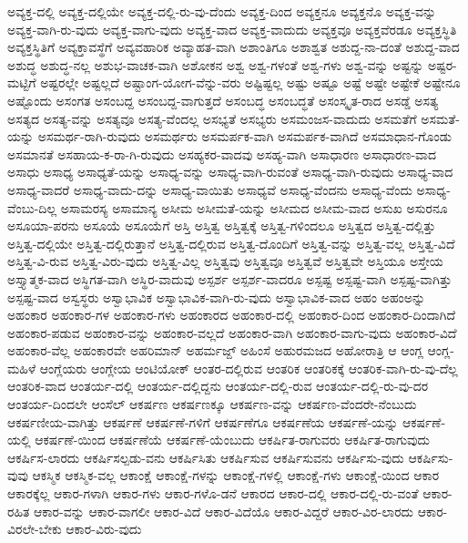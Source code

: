 {ಅವ್ಯಕ್ತ-ದಲ್ಲಿ
ಅವ್ಯಕ್ತ-ದಲ್ಲಿಯೇ
ಅವ್ಯಕ್ತ-ದಲ್ಲಿ-ರು-ವು-ದೆಂದು
ಅವ್ಯಕ್ತ-ದಿಂದ
ಅವ್ಯಕ್ತನೂ
ಅವ್ಯಕ್ತನೊ
ಅವ್ಯಕ್ತ-ವನ್ನು
ಅವ್ಯಕ್ತ-ವಾಗಿ-ರು-ವುದು
ಅವ್ಯಕ್ತ-ವಾಗು-ವುದು
ಅವ್ಯಕ್ತ-ವಾದ
ಅವ್ಯಕ್ತ-ವಾದುದು
ಅವ್ಯಕ್ತವೂ
ಅವ್ಯಕ್ತವೆರಡೂ
ಅವ್ಯಕ್ತಸ್ಥಿತಿ
ಅವ್ಯಕ್ತಸ್ಥಿತಿಗೆ
ಅವ್ಯಕ್ತಾವಸ್ಥೆಗೆ
ಅವ್ಯವಹಾರಿಕ
ಅವ್ಯಾಹತ-ವಾಗಿ
ಅಶಾಂತಿಗೂ
ಅಶಾಶ್ವತ
ಅಶುದ್ದ-ನಾ-ದಂತೆ
ಅಶುದ್ದ-ವಾದ
ಅಶುದ್ಧ
ಅಶುದ್ಧ-ನಲ್ಲ
ಅಶುಭ-ವಾಚಕ-ವಾಗಿ
ಅಶೋಕನ
ಅಶ್ವ
ಅಶ್ವ-ಗಳಂತೆ
ಅಶ್ವ-ಗಳು
ಅಶ್ವ-ವನ್ನು
ಅಷ್ಟನ್ನು
ಅಷ್ಟರ-ಮಟ್ಟಿಗೆ
ಅಷ್ಟರಲ್ಲೇ
ಅಷ್ಟಲ್ಲದೆ
ಅಷ್ಟಾಂಗ-ಯೋಗ-ವೆನ್ನು-ವರು
ಅಷ್ಟಿಷ್ಟಲ್ಲ
ಅಷ್ಟು
ಅಷ್ಟೂ
ಅಷ್ಟೆ
ಅಷ್ಟೇ
ಅಷ್ಟೇಕೆ
ಅಷ್ಟೇನೂ
ಅಷ್ಟೊಂದು
ಅಸಂಗತ
ಅಸಂಬದ್ದ
ಅಸಂಬದ್ದ-ವಾಗುತ್ತದೆ
ಅಸಂಬದ್ಧ
ಅಸಂಬದ್ಧತೆ
ಅಸಂಸ್ಕೃತ-ರಾದ
ಅಸಡ್ಡೆ
ಅಸತ್ಯ
ಅಸತ್ಯದ
ಅಸತ್ಯ-ವನ್ನು
ಅಸತ್ಯವೂ
ಅಸತ್ಯ-ವೆಂದಲ್ಲ
ಅಸಭ್ಯತೆ
ಅಸಭ್ಯರು
ಅಸಮಂಜಸ-ವಾದುದು
ಅಸಮತೆಗೆ
ಅಸಮತೆ-ಯನ್ನು
ಅಸಮರ್ಥ-ರಾಗಿ-ರುವುದು
ಅಸಮರ್ಥರು
ಅಸಮರ್ಪಕ-ವಾಗಿ
ಅಸಮರ್ಪಕ-ವಾಗಿದೆ
ಅಸಮಾಧಾನ-ಗೊಂಡು
ಅಸಮಾನತೆ
ಅಸಹಾಯ-ಕ-ರಾ-ಗಿ-ರುವುದು
ಅಸಹ್ಯಕರ-ವಾದವು
ಅಸಹ್ಯ-ವಾಗಿ
ಅಸಾಧಾರಣ
ಅಸಾಧಾರಣ-ವಾದ
ಅಸಾಧು
ಅಸಾಧ್ಯ
ಅಸಾಧ್ಯತೆ-ಯನ್ನು
ಅಸಾಧ್ಯ-ವನ್ನು
ಅಸಾಧ್ಯ-ವಾಗಿ-ರುವಂತೆ
ಅಸಾಧ್ಯ-ವಾಗಿ-ರುವುದು
ಅಸಾಧ್ಯ-ವಾದ
ಅಸಾಧ್ಯ-ವಾದರೆ
ಅಸಾಧ್ಯ-ವಾದು-ದನ್ನು
ಅಸಾಧ್ಯ-ವಾಯಿತು
ಅಸಾಧ್ಯವೆ
ಅಸಾಧ್ಯ-ವೆಂದನು
ಅಸಾಧ್ಯ-ವೆಂದು
ಅಸಾಧ್ಯ-ವೆಂಬು-ದಿಲ್ಲ
ಅಸಾಮರಸ್ಯ
ಅಸಾಮಾನ್ಯ
ಅಸೀಮ
ಅಸೀಮತೆ-ಯನ್ನು
ಅಸೀಮದ
ಅಸೀಮ-ವಾದ
ಅಸುಖ
ಅಸುರನೂ
ಅಸೂಯಾ-ಪರನು
ಅಸೂಯೆ
ಅಸೂಯೆಗೆ
ಅಸ್ತಿ
ಅಸ್ತಿತ್ವ
ಅಸ್ತಿತ್ವಕ್ಕೆ
ಅಸ್ತಿತ್ವ-ಗಳಿಂದಲೂ
ಅಸ್ತಿತ್ವದ
ಅಸ್ತಿತ್ವ-ದಲ್ಲಿತ್ತು
ಅಸ್ತಿತ್ವ-ದಲ್ಲಿಯೇ
ಅಸ್ತಿತ್ವ-ದಲ್ಲಿರುತ್ತಾನೆ
ಅಸ್ತಿತ್ವ-ದಲ್ಲಿರುವ
ಅಸ್ತಿತ್ವ-ದೊಂದಿಗೆ
ಅಸ್ತಿತ್ವ-ವನ್ನು
ಅಸ್ತಿತ್ವ-ವಲ್ಲ
ಅಸ್ತಿತ್ವ-ವಿದೆ
ಅಸ್ತಿತ್ವ-ವಿ-ರುವ
ಅಸ್ತಿತ್ವ-ವಿರು-ವುದು
ಅಸ್ತಿತ್ವ-ವಿಲ್ಲ
ಅಸ್ತಿತ್ವವು
ಅಸ್ತಿತ್ವವೂ
ಅಸ್ತಿತ್ವವೆ
ಅಸ್ತಿತ್ವವೇ
ಅಸ್ತಿಯೂ
ಅಸ್ತೇಯ
ಅಸ್ತ್ಯಾತ್ಮಕ-ವಾದ
ಅಸ್ಥಿಗತ-ವಾಗಿ
ಅಸ್ಥಿರ-ವಾದುವು
ಅಸ್ಪರ್ಶ
ಅಸ್ಪರ್ಶ-ವಾದರೂ
ಅಸ್ಪಷ್ಟ
ಅಸ್ಪಷ್ಟ-ವಾಗಿ
ಅಸ್ಪಷ್ಟ-ವಾಗಿತ್ತು
ಅಸ್ಪಷ್ಟ-ವಾದ
ಅಸ್ವಸ್ಥರು
ಅಸ್ವಾಭಾವಿಕ
ಅಸ್ವಾಭಾವಿಕ-ವಾಗಿ-ರು-ವುದು
ಅಸ್ವಾಭಾವಿಕ-ವಾದ
ಅಹಂ
ಅಹಂಅನ್ನು
ಅಹಂಕಾರ
ಅಹಂಕಾರ-ಗಳ
ಅಹಂಕಾರ-ಗಳು
ಅಹಂಕಾರದ
ಅಹಂಕಾರ-ದಲ್ಲಿ
ಅಹಂಕಾರ-ದಿಂದ
ಅಹಂಕಾರ-ದಿಂದಾಗಿದೆ
ಅಹಂಕಾರ-ಪಡುವ
ಅಹಂಕಾರ-ವನ್ನು
ಅಹಂಕಾರ-ವಲ್ಲದೆ
ಅಹಂಕಾರ-ವಾಗಿ
ಅಹಂಕಾರ-ವಾಗು-ವುದು
ಅಹಂಕಾರ-ವಿದೆ
ಅಹಂಕಾರ-ವೆಲ್ಲ
ಅಹಂಕಾರವೇ
ಅಹರಿಮಾನ್
ಅಹರ್ಮಜ್ದ್
ಅಹಿಂಸೆ
ಅಹುರಮಜದ
ಅಹೋರಾತ್ರಿ
ಆ
ಆಂಗ್ಲ
ಆಂಗ್ಲ-ಮಹಿಳೆ
ಆಂಗ್ಲೆಯರು
ಆಂಗ್ಲೇಯ
ಆಂಟಿಯೋಕ್
ಆಂತರ-ದಲ್ಲಿರುವ
ಆಂತರಿಕ
ಆಂತರಿಕಕ್ಕೆ
ಆಂತರಿಕ-ವಾಗಿ-ರು-ವು-ದೆಲ್ಲ
ಆಂತರಿಕ-ವಾದ
ಆಂತರ್ಯ-ದಲ್ಲಿ
ಆಂತರ್ಯ-ದಲ್ಲಿದ್ದನು
ಆಂತರ್ಯ-ದಲ್ಲಿ-ರುವ
ಆಂತರ್ಯ-ದಲ್ಲಿ-ರು-ವು-ದರ
ಆಂತರ್ಯ-ದಿಂದಲೇ
ಆಂಸೆಲ್
ಆಕರ್ಷಣ
ಆಕರ್ಷಣಕ್ಕೂ
ಆಕರ್ಷಣ-ವನ್ನು
ಆಕರ್ಷಣ-ವೆಂದರೇ-ನೆಂಬುದು
ಆಕರ್ಷಣೀಯ-ವಾಗಿತ್ತು
ಆಕರ್ಷಣೆ
ಆಕರ್ಷಣೆ-ಗಳಿಗೆ
ಆಕರ್ಷಣೆಗೂ
ಆಕರ್ಷಣೆಯ
ಆಕರ್ಷಣೆ-ಯನ್ನು
ಆಕರ್ಷಣೆ-ಯಲ್ಲಿ
ಆಕರ್ಷಣೆ-ಯಿಂದ
ಆಕರ್ಷಣೆಯೆ
ಆಕರ್ಷಣೆ-ಯೆಂಬುದು
ಆಕರ್ಷಿತ-ರಾಗುವರು
ಆಕರ್ಷಿತ-ರಾಗುವುದು
ಆಕರ್ಷಿಸ-ಲಾರದು
ಆಕರ್ಷಿಸಲ್ಪಡು-ವನು
ಆಕರ್ಷಿಸಿತು
ಆಕರ್ಷಿಸುವ
ಆಕರ್ಷಿಸುವನು
ಆಕರ್ಷಿಸು-ವುದು
ಆಕರ್ಷಿಸು-ವುವು
ಆಕಸ್ಮಿಕ
ಆಕಸ್ಮಿಕ-ವಲ್ಲ
ಆಕಾಂಕ್ಷೆ
ಆಕಾಂಕ್ಷೆ-ಗಳನ್ನು
ಆಕಾಂಕ್ಷೆ-ಗಳಲ್ಲಿ
ಆಕಾಂಕ್ಷೆ-ಗಳು
ಆಕಾಂಕ್ಷೆ-ಯಿಂದ
ಆಕಾರ
ಆಕಾರಕ್ಕೆಲ್ಲ
ಆಕಾರ-ಗಳಾಗಿ
ಆಕಾರ-ಗಳು
ಆಕಾರ-ಗಳೊ-ಡನೆ
ಆಕಾರದ
ಆಕಾರ-ದಲ್ಲಿ
ಆಕಾರ-ದಲ್ಲಿ-ರು-ವಂತೆ
ಆಕಾರ-ರಹಿತ
ಆಕಾರ-ವನ್ನು
ಆಕಾರ-ವಾಗಲೀ
ಆಕಾರ-ವಿದೆ
ಆಕಾರ-ವಿದೆಯೊ
ಆಕಾರ-ವಿದ್ದರೆ
ಆಕಾರ-ವಿರ-ಲಾರದು
ಆಕಾರ-ವಿರಲೇ-ಬೇಕು
ಆಕಾರ-ವಿರು-ವುದು
}

